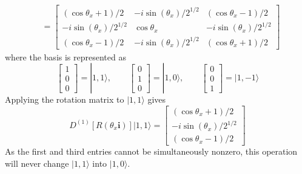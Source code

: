 \documentclass[../principles-of-quantum-mechanics.tex]{subfiles}
\begin{document}
\begin{questions}
\begin{solution}
\begin{align*}
				&= \begin{bmatrix}
					(\cos\theta_x + 1)/2 & -i\sin(\theta_x)/2^{1/2} & (\cos\theta_x - 1)/2 \\
					-i\sin(\theta_x)/2^{1/2} & \cos\theta_x & -i\sin(\theta_x)/2^{1/2} \\
					(\cos\theta_x - 1)/2 & -i\sin(\theta_x)/2^{1/2} & (\cos\theta_x+ 1)/2
				\end{bmatrix}
			\end{align*}
			where the basis is represented as
			$$\begin{bmatrix}1 \\ 0 \\ 0\end{bmatrix} = |1, 1\rangle, \qquad \begin{bmatrix}0 \\ 1 \\ 0\end{bmatrix} = |1, 0\rangle, \qquad \begin{bmatrix}0 \\ 0 \\ 1\end{bmatrix} = |1, {-1}\rangle$$
			Applying the rotation matrix to $|1, 1\rangle$ gives
			$$D^{(1)}[R(\theta_x\mathbf{i})]|1, 1\rangle = \begin{bmatrix}(\cos\theta_x + 1)/2 \\ -i\sin(\theta_x)/2^{1/2} \\ (\cos\theta_x - 1)/2\end{bmatrix}$$
			As the first and third entries cannot be simultaneously nonzero, this operation will never change $|1, 1\rangle$ into $|1, 0\rangle$.
			

\end{solution}
\end{questions}
\end{document}
